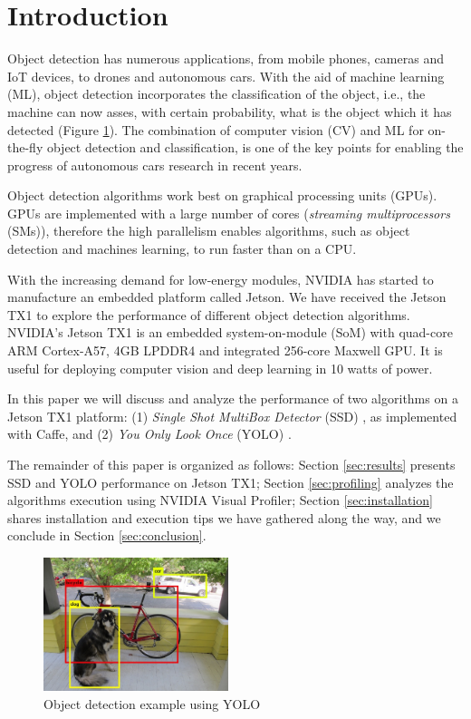 \section{Introduction}
\label{sec:intro}

Object detection has numerous applications, from mobile phones, cameras and IoT devices, to drones and autonomous cars. With the aid of machine learning (ML), object detection incorporates the classification of the object, i.e., the machine can now asses, with certain probability, what is the object which it has detected (Figure \ref{fig:detection_example}). The combination of computer vision (CV) and ML for on-the-fly object detection and classification, is one of the key points
for enabling the progress of autonomous cars research in recent years.

Object detection algorithms work best on graphical processing units (GPUs). GPUs are implemented with a large number of cores (\textit{streaming multiprocessors} (SMs)), therefore the high parallelism enables algorithms, such as object detection and machines learning, to run faster than on a CPU.

With the increasing demand for low-energy modules, NVIDIA has started to manufacture an embedded platform called Jetson. We have received the Jetson TX1 to explore the performance of different object detection algorithms. NVIDIA's Jetson TX1 is an embedded system-on-module (SoM) with quad-core ARM Cortex-A57, 4GB LPDDR4 and integrated 256-core Maxwell GPU. It is useful for deploying computer vision and deep learning in 10 watts of power.

In this paper we will discuss and analyze the performance of two algorithms on a Jetson TX1 platform: (1) \textit{Single Shot MultiBox Detector} (SSD) \cite{liu2016ssd}, as implemented with Caffe, and (2) \textit{You Only Look Once} (YOLO) \cite{redmon2016you}.

The remainder of this paper is organized as follows: Section \ref{sec:results} presents SSD and YOLO performance on Jetson TX1; Section \ref{sec:profiling} analyzes the algorithms execution using NVIDIA Visual Profiler; Section \ref{sec:installation} shares installation and execution tips we have gathered along the way, and we conclude in Section \ref{sec:conclusion}.

\begin{figure}[t]
	\includegraphics[width=0.48\textwidth]{./imgs/detection_example.png}
	\caption{Object detection example using YOLO}
	\label{fig:detection_example}
\end{figure}
